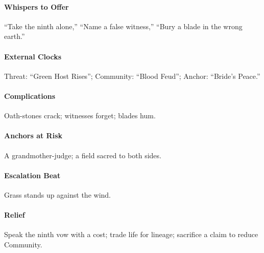 \paragraph{Whispers to Offer} ``Take the ninth alone,'' ``Name a false witness,'' ``Bury a blade in the wrong earth.''
\paragraph{External Clocks} Threat: ``Green Host Rises''; Community: ``Blood Feud''; Anchor: ``Bride’s Peace.''
\paragraph{Complications} Oath-stones crack; witnesses forget; blades hum.
\paragraph{Anchors at Risk} A grandmother-judge; a field sacred to both sides.
\paragraph{Escalation Beat} Grass stands up against the wind.
\paragraph{Relief} Speak the ninth vow with a cost; trade life for lineage; sacrifice a claim to reduce Community.



